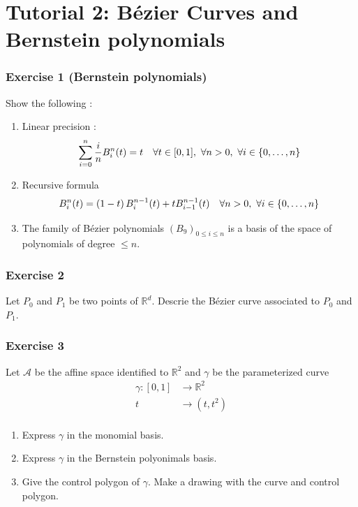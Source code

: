 \section{Tutorial 2: Bézier Curves and Bernstein polynomials}
\label{sec:Tutorial 2: Bézier Curves and Bernstein polynomials}
\subsubsection{Exercise 1 (Bernstein polynomials)} 
Show the following : 
\begin{enumerate}
    \item Linear precision : 
        \[
            \sum_{i=0}^{n} \frac{ i }{ n  } B^n_i(t) = t \quad \forall t\in [0,1], \
            \forall n > 0, \ \forall i \in \set{ 0,\dots, n } 
        \]
    \item Recursive formula 
        \[
            B^n_i(t) = \left( 1-t\right) B _{ i }^{ n-1 } (t) + tB _{ i-1 }^{ n-1 } (t)
            \quad \forall n > 0, \ \forall i \in \set{ 0, \dots, n } 
        \]
    \item The family of Bézier polynomials $ \left( B_9\right) _{ 0\leq i \leq n  }^{  }
        $ is a basis of the space of polynomials of degree $ \leq n  $. 
\end{enumerate}
\subsubsection{Exercise 2}
Let $ P_0 $ and $ P_1 $ be two points of $ \mathbb{R}^d $. Descrie the Bézier curve
associated to $ P_0 $ and $ P_1 $. 

\subsubsection{Exercise 3}
Let $ \mathcal{ A }  $ be the affine space identified to $ \mathbb{R}^2 $ and $ \gamma $
be the parameterized curve 
\begin{align*}
    \gamma :  [0,1] &\to \mathbb{R}^2  \\ 
     t &\to \left( t,t^2\right)  \\ 
\end{align*}
\begin{enumerate}
    \item Express $ \gamma $ in the monomial basis. 
    \item Express $ \gamma $ in the Bernstein polyonimals basis. 
    \item Give the control polygon of $ \gamma $. Make a drawing with the curve and
        control polygon. 
\end{enumerate}

